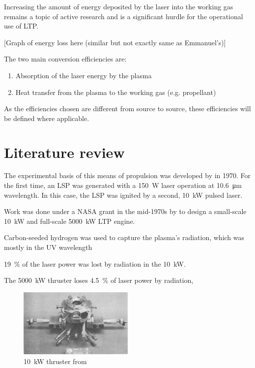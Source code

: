 
        Increasing the amount of energy deposited by the laser into the working gas remains a topic of active research and is a significant hurdle for the operational use of LTP.

        [Graph of energy loss here (similar but not exactly same as Emmanuel's)]

        The two main conversion efficiencies are:
        \begin{enumerate}
            \item Absorption of the laser energy by the plasma
            \item Heat transfer from the plasma to the working gas (e.g. propellant)
        \end{enumerate}

        As the efficiencies chosen are different from source to source, these efficiencies will be defined where applicable.
    
    \section{Literature review}


        The experimental basis of this means of propulsion was developed by \textcite{generalovContinuousOpticalDischarge1970} in 1970. For the first time, an LSP was generated with a \qty{150}{W}  laser operation at \qty{10.6}{μm} wavelength. In this case, the LSP was ignited by a second, \qty{10}{kW} pulsed  laser.
        

        Work was done under a NASA grant in the mid-1970s by \textcite{shojiLaserheatedRocketThruster1977,shojiPerformanceHeatTransfer1976a} to design a small-scale \qty{10}{kW} and full-scale \qty{5000}{kW} LTP engine.
        
        Carbon-seeded hydrogen was used to capture the plasma's radiation, which was mostly in the UV wavelength 

        \qty{19}{\%} of the laser power was lost by radiation in the \qty{10}{kW}. 
        
        The \qty{5000}{kW} thruster loses \qty{4.5}{\%} of laser power by radiation, 

        \begin{figure}[!ht]
            \centering
            \includegraphics[width=0.5\textwidth]{assets/2 background/Shoji_assy.png}
            \caption{\qty{10}{kW} thruster from \textcite{shojiPerformanceHeatTransfer1976a}}
            \label{fig:Shoji apparatus}
        \end{figure}

